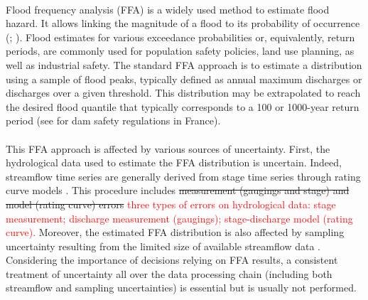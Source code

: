 \documentclass[11pt]{article}
\begin{document}
    \paragraph{}
    Flood frequency analysis (FFA) is a widely used method to estimate flood hazard. It allows linking the magnitude of a flood to its probability of occurrence (\citet{hamed_flood_2019}; \citet{jain_design_2019}). Flood estimates for various exceedance probabilities or, equivalently, return periods, are commonly used for population safety policies, land use planning, as well as industrial safety. The standard FFA approach is to estimate a distribution using a sample of flood peaks, typically defined as annual maximum discharges or discharges over a given threshold. This distribution may be extrapolated to reach the desired flood quantile that typically corresponds to a 100 or 1000-year return period (see \cite{le_delliou_recommandations_2014} for dam safety regulations in France). 
    
    \paragraph{}
    This FFA approach is affected by various sources of uncertainty. First, the hydrological data used to estimate the FFA distribution is uncertain. Indeed, streamflow time series are generally derived from stage time series through rating curve models \citep{rantz_measurement_1982}. This procedure includes \sout{measurement (gaugings and stage) and model (rating curve) errors} \textcolor{red}{three types of errors on hydrological data: stage measurement; discharge measurement (gaugings); stage-discharge model (rating curve).} Moreover, the estimated FFA distribution is also affected by sampling uncertainty resulting from the limited size of available streamflow data \citep{kjeldsen_uncertainty_2011}. Considering the importance of decisions relying on FFA results, a consistent treatment of uncertainty all over the data processing chain (including both streamflow and sampling uncertainties) is essential but is usually not performed.
    
\end{document}

